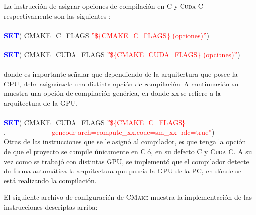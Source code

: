 La instrucción de asignar opciones de compilación en \textsc{C} y \textsc{Cuda C} respectivamente son las siguientes :
\\\\
\textcolor{blue}{\textbf{SET}}( CMAKE\_C\_FLAGS  \textcolor{red}{''\$\{CMAKE\_C\_FLAGS\} (opciones)''})
\\\\
\textcolor{blue}{\textbf{SET}}( CMAKE\_CUDA\_FLAGS  \textcolor{red}{''\$\{CMAKE\_CUDA\_FLAGS\} (opciones)''})
\\
\\
donde es importante señalar que dependiendo de la arquitectura que posee la GPU, debe asignársele una distinta opción de compilación. A continuación su muestra una opción de compilación genérica, en donde xx se refiere a la arquitectura de la GPU.
\\
\\
\textcolor{blue}{\textbf{SET}}( CMAKE\_CUDA\_FLAGS \textcolor{red}{''\$\{CMAKE\_C\_FLAGS\}}\\
                 $.\qquad \qquad \qquad $\textcolor{red}{ -gencode arch=compute\_xx,code=sm\_xx -rdc=true''})
\\


Otras de las instrucciones que se le asignó al compilador, es que tenga la opción de que el proyecto se  compile únicamente en \textsc{C} ó, en su defecto  \textsc{C} y \textsc{Cuda C}. A su vez como se trabajó con distintas GPU, se implementó que el compilador detecte de forma automática la arquitectura que poseía la GPU de la PC, en dónde se está realizando la compilación. 

El siguiente archivo de configuración de \textsc{CMake} muestra la implementación de las instrucciones descriptas arriba:
\newpage

